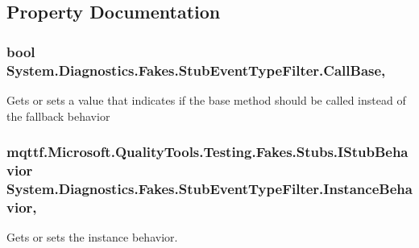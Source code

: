 \subsection{Property Documentation}
\hypertarget{class_system_1_1_diagnostics_1_1_fakes_1_1_stub_event_type_filter_a965f3efd23b86fa1c5a17b7a4c844be9}{
\subsubsection[{Call\-Base}]{\setlength{\rightskip}{0pt plus 5cm}bool System.\-Diagnostics.\-Fakes.\-Stub\-Event\-Type\-Filter.\-Call\-Base\hspace{0.3cm}{\ttfamily [get]}, {\ttfamily [set]}}}\label{class_system_1_1_diagnostics_1_1_fakes_1_1_stub_event_type_filter_a965f3efd23b86fa1c5a17b7a4c844be9}


Gets or sets a value that indicates if the base method should be called instead of the fallback behavior

\hypertarget{class_system_1_1_diagnostics_1_1_fakes_1_1_stub_event_type_filter_ac8e27d3939921f231cfd25c1526cc441}{
\subsubsection[{Instance\-Behavior}]{\setlength{\rightskip}{0pt plus 5cm}mqttf.\-Microsoft.\-Quality\-Tools.\-Testing.\-Fakes.\-Stubs.\-I\-Stub\-Behavior System.\-Diagnostics.\-Fakes.\-Stub\-Event\-Type\-Filter.\-Instance\-Behavior\hspace{0.3cm}{\ttfamily [get]}, {\ttfamily [set]}}}\label{class_system_1_1_diagnostics_1_1_fakes_1_1_stub_event_type_filter_ac8e27d3939921f231cfd25c1526cc441}


Gets or sets the instance behavior.

